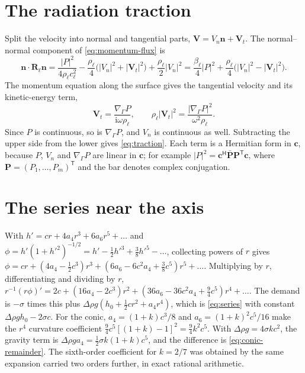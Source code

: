 \documentclass[11pt,a4paper]{article}
\numberwithin{equation}{section}
\newcommand{\nn}{\bm n}
\newcommand{\Gs}{\nabla_\Gamma}
\begin{document}
\appendix
\section{The radiation traction}\label{app:traction}
Split the velocity into normal and tangential parts, $\bm V=V_n\nn+\bm V_t$.
The normal--normal component of \cref{eq:momentum-flux} is
\[
 \nn\cdot\bm R_\ell\nn=\frac{|P|^2}{4\rho_\ell c_\ell^2}
   -\frac{\rho_\ell}{4}\bigl(|V_n|^2+|\bm V_t|^2\bigr)
   +\frac{\rho_\ell}{2}|V_n|^2
 =\frac{\beta_\ell}{4}|P|^2+\frac{\rho_\ell}{4}\bigl(|V_n|^2-|\bm V_t|^2\bigr).
\]
The momentum equation along the surface gives the tangential velocity and its
kinetic-energy term,
\[
 \bm V_t=\frac{\Gs P}{\mathrm i\omega\rho_\ell},\qquad
 \rho_\ell|\bm V_t|^2=\frac{|\Gs P|^2}{\omega^2\rho_\ell}.
\]
Since $P$ is continuous,
so is $\Gs P$, and $V_n$ is continuous as well. Subtracting the upper side from
the lower gives \cref{eq:traction}. Each term is a Hermitian form in $\bm c$,
because $P$, $V_n$ and $\Gs P$ are linear in $\bm c$; for example
$|P|^2=\bm c^{\mathsf H}\bar{\bm P}\bm P^{\mathsf T}\bm c$, where
$\bm P=(P_1,\dots,P_m)^{\mathsf T}$ and the bar denotes complex conjugation.

\section{The series near the axis}\label{app:series}
With $h'=cr+4a_4r^3+6a_6r^5+\dots$ and
$\phi=h'(1+h'^2)^{-1/2}=h'-\tfrac12h'^3+\tfrac38h'^5-\dots$, collecting powers of
$r$ gives $\phi=cr+(4a_4-\tfrac12c^3)r^3+(6a_6-6c^2a_4+\tfrac38c^5)r^5+\dots$.
Multiplying by $r$, differentiating and dividing by $r$,
$r^{-1}(r\phi)'=2c+(16a_4-2c^3)r^2+(36a_6-36c^2a_4+\tfrac94c^5)r^4+\dots$.
The demand is $-\sigma$ times this plus $\Delta\rho g(h_0+\tfrac12cr^2+a_4r^4)$,
which is \cref{eq:series} with constant $\Delta\rho gh_0-2\sigma c$. For the
conic, $a_4=(1+k)c^3/8$ and $a_6=(1+k)^2c^5/16$ make the $r^4$ curvature
coefficient $\tfrac94c^5[(1+k)-1]^2=\tfrac94k^2c^5$. With
$\Delta\rho g=4\sigma kc^2$, the gravity term is
$\Delta\rho ga_4=\tfrac12\sigma k(1+k)c^5$, and the difference is
\cref{eq:conic-remainder}. The sixth-order coefficient for $k=2/7$ was obtained
by the same expansion carried two orders further, in exact rational arithmetic.
\end{document}
